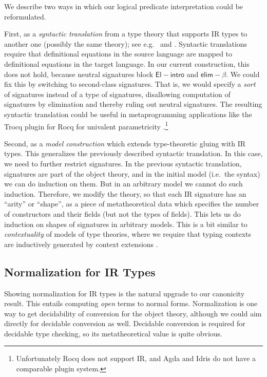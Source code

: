 \documentclass[acmsmall,screen,review,anonymous]{acmart}
\newcommand{\msf}[1]{{\mathsf{#1}}}
\newcommand{\elim}{\msf{elim}}
\newcommand{\Elintro}{\msf{El\!\!-\!\!intro}}
\newcommand{\elimbeta}{\elim\!-\!\!\beta}
\begin{document}
We describe two ways in which our logical predicate interpretation could be reformulated.

First, as a \emph{syntactic translation} from a type theory that supports IR types to another one
(possibly the same theory); see e.g.\ \cite{next700} and \cite{bernardy12parametricity}. Syntactic
translations require that definitional equations in the source language are mapped to definitional
equations in the target language. In our current construction, this does not hold, because neutral
signatures block $\Elintro$ and $\elimbeta$. We could fix this by switching to second-class
signatures. That is, we would specify a \emph{sort} of signatures instead of a type of signatures,
disallowing computation of signatures by elimination and thereby ruling out neutral signatures. The
resulting syntactic translation could be useful in metaprogramming applications like the Trocq
plugin for Rocq for univalent parametricity \cite{cohen2024trocq}.\footnote{Unfortunately Rocq does
not support IR, and Agda and Idris do not have a comparable plugin system.}

Second, as a \emph{model construction} which extends type-theoretic gluing with IR types. This
generalizes the previously described syntactic translation. In this case, we need to further
restrict signatures. In the previous syntactic translation, signatures are part of the object
theory, and in the initial model (i.e.\ the syntax) we can do induction on them. But in an arbitrary
model we cannot do such induction. Therefore, we modify the theory, so that each IR signature has
an ``arity'' or ``shape'', as a piece of metatheoretical data which specifies the number of
constructors and their fields (but not the types of fields). This lets us do induction on shapes of
signatures in arbitrary models. This is a bit similar to \emph{contextuality} of models of type
theories, where we require that typing contexts are inductively generated by context extensions
\cite{gat,cwfs}.

\subsection{Normalization for IR Types}

Showing normalization for IR types is the natural upgrade to our canonicity result. This entails
computing \emph{open} terms to normal forms. Normalization is one way to get decidability of
conversion for the object theory, although we could aim directly for decidable conversion as well.
Decidable conversion is required for decidable type checking, so its metatheoretical value is quite
obvious.
\end{document}

